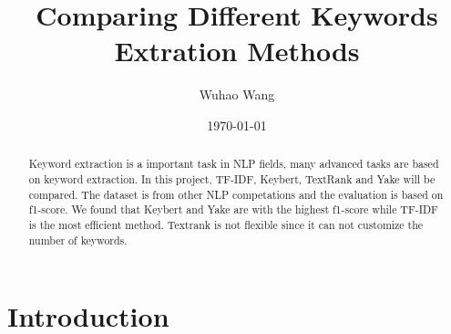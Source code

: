 \documentclass[11pt,a4paper]{article}
\title{Comparing Different Keywords Extration Methods}
\author{Wuhao Wang}
\date{\today}
\begin{document}
\maketitle


\begin{abstract}
Keyword extraction is a important task in NLP fields, many advanced tasks are based on keyword extraction.
In this project, TF-IDF, Keybert, TextRank and Yake will be compared. The dataset is from other NLP competations
and the evaluation is based on f1-score. We found that Keybert and Yake are with the highest f1-score while
TF-IDF is the most efficient method. Textrank is not flexible since it can not customize the number of keywords.  
\end{abstract}
\section{Introduction}
\end{document}
